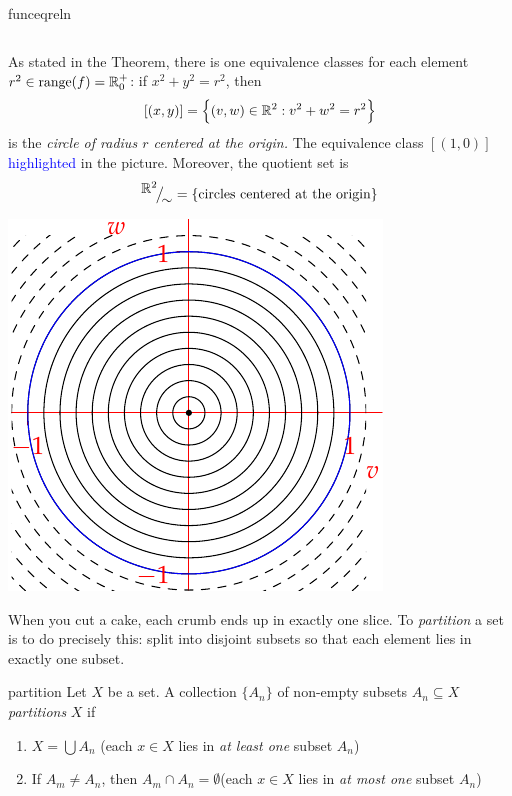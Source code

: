 \begin{examples}{}{funceqreln}
\begin{enumerate}
\[		\]
		\begin{minipage}[t]{0.67\linewidth}\vspace{-10pt}
			As stated in the Theorem, there is one equivalence classes for each element $r^2\in\operatorname{range}(f)=\mathbb{R}^+_0$: if $x^2+y^2=r^2$, then
			\[
		  	[(x,y)]=\Bigl\{(v,w)\in\mathbb{R}^2:v^2+w^2=r^2\Bigr\}
			\]
			is the \emph{circle of radius $r$ centered at the origin.} The equivalence class $[(1,0)]$ \textcolor{blue}{highlighted} in the picture. Moreover, the quotient set is
			\[
				{}^{\textstyle {\mathbb{R}^2}}\!\big/_{\textstyle \!{\sim}}=\{\text{circles centered at the origin}\}
			\]
		\end{minipage}
		\hfill
		\begin{minipage}[t]{0.3\linewidth}\vspace{-20pt}
			\hfill
			\includegraphics{relations-24-circles}
		\end{minipage}
	\end{enumerate}
	
\end{examples}


\vspace{-8pt}


When you cut a cake, each crumb ends up in exactly one slice. To \emph{partition} a set is to do precisely this: split into disjoint subsets so that each element lies in exactly one subset.

\begin{defn}{}{partition}
	Let $X$ be a set. A collection $\{A_n\}$ of non-empty subsets $A_n\subseteq X$ \emph{partitions} $X$ if
	\begin{enumerate}
		\item $X=\bigcup A_n$ \hfill(each $x\in X$ lies in \emph{at least one} subset $A_n$)
		\item If $A_m\neq A_n$, then $A_m\cap A_n=\emptyset$\hfill(each $x\in X$ lies in \emph{at most one\footnotemark} subset $A_n$)
	\end{enumerate}
\end{defn}

